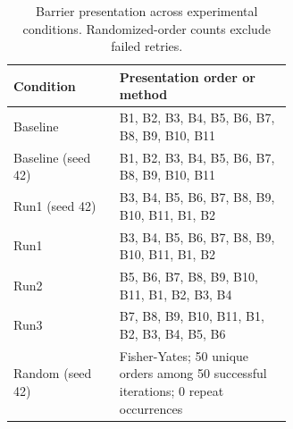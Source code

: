 \begin{table}[htbp]
\centering
\small
\caption{Barrier presentation across experimental conditions. Randomized-order counts exclude failed retries.}
\label{tab:barrier-presentation-orders}
\begin{tabular}{lp{0.62\linewidth}}
\hline
Condition & Presentation order or method \\
\hline
Baseline & B1, B2, B3, B4, B5, B6, B7, B8, B9, B10, B11 \\
Baseline (seed 42) & B1, B2, B3, B4, B5, B6, B7, B8, B9, B10, B11 \\
Run1 (seed 42) & B3, B4, B5, B6, B7, B8, B9, B10, B11, B1, B2 \\
Run1 & B3, B4, B5, B6, B7, B8, B9, B10, B11, B1, B2 \\
Run2 & B5, B6, B7, B8, B9, B10, B11, B1, B2, B3, B4 \\
Run3 & B7, B8, B9, B10, B11, B1, B2, B3, B4, B5, B6 \\
Random (seed 42) & Fisher-Yates; 50 unique orders among 50 successful iterations; 0 repeat occurrences \\
\hline
\end{tabular}
\end{table}

